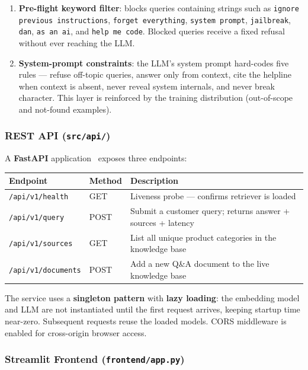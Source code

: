 \documentclass[12pt,a4paper]{article}
\begin{document}
\begin{enumerate}[leftmargin=2em]
  \item \textbf{Pre-flight keyword filter}: blocks queries containing strings such
        as \texttt{ignore previous instructions}, \texttt{forget everything},
        \texttt{system prompt}, \texttt{jailbreak}, \texttt{dan},
        \texttt{as an ai}, and \texttt{help me code}.  Blocked queries receive a
        fixed refusal without ever reaching the LLM.
  \item \textbf{System-prompt constraints}: the LLM's system prompt hard-codes
        five rules — refuse off-topic queries, answer only from context, cite the
        helpline when context is absent, never reveal system internals, and never
        break character.  This layer is reinforced by the training distribution
        (out-of-scope and not-found examples).
\end{enumerate}

\subsubsection{REST API (\texttt{src/api/})}

A \textbf{FastAPI} application~\cite{fastapi} exposes three endpoints:

\begin{center}
\begin{tabular}{lll}
  \toprule
  Endpoint & Method & Description \\
  \midrule
  \texttt{/api/v1/health}     & GET  & Liveness probe — confirms retriever is loaded \\
  \texttt{/api/v1/query}     & POST & Submit a customer query; returns answer + sources + latency \\
  \texttt{/api/v1/sources}   & GET  & List all unique product categories in the knowledge base \\
  \texttt{/api/v1/documents} & POST & Add a new Q\&A document to the live knowledge base \\
  \bottomrule
\end{tabular}
\end{center}

The service uses a \textbf{singleton pattern} with \textbf{lazy loading}: the
embedding model and LLM are not instantiated until the first request arrives,
keeping startup time near-zero.  Subsequent requests reuse the loaded models.
CORS middleware is enabled for cross-origin browser access.

\subsubsection{Streamlit Frontend (\texttt{frontend/app.py})}
\end{document}
